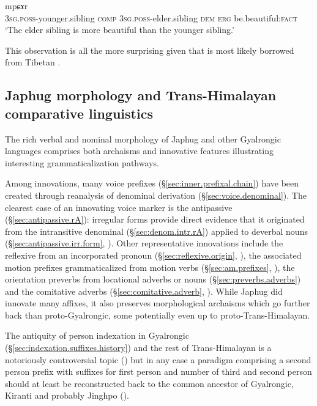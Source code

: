 \begin{exe}
\ex \label{ex:sAz.mpCAr}
\gll  [ɯ-ʁi sɤz] [ɯ-pi nɯ kɯ] mpɕɤr  \\
\textsc{3sg}.\textsc{poss}-younger.sibling \textsc{comp} \textsc{3sg}.\textsc{poss}-elder.sibling \textsc{dem} \textsc{erg} be.beautiful:\textsc{fact} \\
\glt `The elder sibling is more beautiful than the younger sibling.' 
\end{exe}

This observation is all the more surprising given that  is most likely borrowed from Tibetan \citep{jacques16comparative}.

\subsection{Japhug morphology and Trans-Himalayan comparative linguistics} \label{sec:comparative.morphology.intro}
The rich verbal and nominal morphology of Japhug and other Gyalrongic languages comprises both archaisms  and innovative features illustrating interesting grammaticalization pathways.

Among innovations, many voice prefixes (§\ref{sec:inner.prefixal.chain}) have been created through reanalysis of denominal derivation (§\ref{sec:voice.denominal}). The clearest case of an innovating voice marker is the antipassive  (§\ref{sec:antipassive.rA}): irregular forms provide direct evidence  that it originated from the intransitive denominal   (§\ref{sec:denom.intr.rA}) applied to deverbal nouns (§\ref{sec:antipassive.irr.form},  \citealt{jacques14antipassive}). Other representative innovations include the reflexive  from an incorporated pronoun (§\ref{sec:reflexive.origin}, \citealt{jacques10refl}), the associated motion prefixes grammaticalized from motion verbs (§\ref{sec:am.prefixes}, \citealt{jacques13harmonization}), the orientation preverbs from locational adverbs or nouns (§\ref{sec:preverbs.adverbs}) and the comitative adverbs (§\ref{sec:comitative.adverb}, \citealt{jacques17comitative}).
While Japhug did innovate many affixes, it also preserves morphological archaisms which go further back than proto-Gyalrongic, some potentially even up to proto-Trans-Himalayan.

The antiquity of person indexation in Gyalrongic (§\ref{sec:indexation.suffixes.history}) and the rest of Trans-Himalayan is a notoriously controversial topic (\citealt{bauman75, delancey89agreement, lapolla92, driem93agreement}) but in any case a paradigm comprising a second person prefix with suffixes for first person and number of third and second person should at least be reconstructed back to the common ancestor of Gyalrongic, Kiranti and probably Jinghpo (\citealt{jacques12agreement, delancey14second, jacques16th}).

